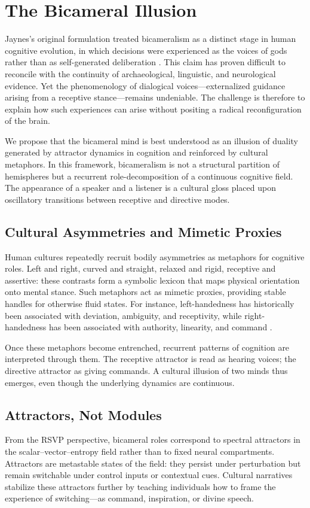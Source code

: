 \documentclass[a4paper,11pt]{article}
\begin{document}
\section{The Bicameral Illusion}
\label{sec:bicameral-illusion}

Jaynes’s original formulation treated bicameralism as a distinct stage in human cognitive evolution, in which decisions were experienced as the voices of gods rather than as self-generated deliberation \citep{jaynes1976origin}. This claim has proven difficult to reconcile with the continuity of archaeological, linguistic, and neurological evidence. Yet the phenomenology of dialogical voices—externalized guidance arising from a receptive stance—remains undeniable. The challenge is therefore to explain how such experiences can arise without positing a radical reconfiguration of the brain.

We propose that the bicameral mind is best understood as an illusion of duality generated by attractor dynamics in cognition and reinforced by cultural metaphors. In this framework, bicameralism is not a structural partition of hemispheres but a recurrent role-decomposition of a continuous cognitive field. The appearance of a speaker and a listener is a cultural gloss placed upon oscillatory transitions between receptive and directive modes.

\subsection{Cultural Asymmetries and Mimetic Proxies}
Human cultures repeatedly recruit bodily asymmetries as metaphors for cognitive roles. Left and right, curved and straight, relaxed and rigid, receptive and assertive: these contrasts form a symbolic lexicon that maps physical orientation onto mental stance. Such metaphors act as mimetic proxies, providing stable handles for otherwise fluid states. For instance, left-handedness has historically been associated with deviation, ambiguity, and receptivity, while right-handedness has been associated with authority, linearity, and command \citep{McManus2002}.

Once these metaphors become entrenched, recurrent patterns of cognition are interpreted through them. The receptive attractor is read as hearing voices; the directive attractor as giving commands. A cultural illusion of two minds thus emerges, even though the underlying dynamics are continuous.

\subsection{Attractors, Not Modules}
From the RSVP perspective, bicameral roles correspond to spectral attractors in the scalar--vector--entropy field rather than to fixed neural compartments. Attractors are metastable states of the field: they persist under perturbation but remain switchable under control inputs or contextual cues. Cultural narratives stabilize these attractors further by teaching individuals how to frame the experience of switching—as command, inspiration, or divine speech.
\end{document}
